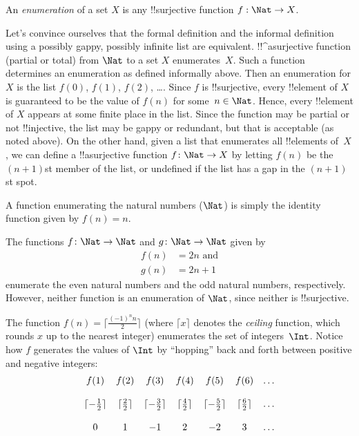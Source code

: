 \documentclass[../../include/open-logic-section]{subfiles}
\begin{document}
\begin{defn}
An \emph{enumeration} of a set $X$ is any !!{surjective} function $f: 
\Nat \rightarrow X$.
\end{defn}

\begin{explain}
Let's convince ourselves that the formal definition and the informal
definition using a possibly gappy, possibly infinite list are
equivalent. !!^a{surjective} function (partial or total) from $\Nat$ to
a set $X$ enumerates~$X$. Such a function determines an enumeration as
defined informally above. Then an enumeration for $X$ is the list
$f(0)$, $f(1)$, $f(2)$, \dots. Since $f$ is !!{surjective}, every
!!{element} of $X$ is guaranteed to be the value of $f(n)$ for some~$n
\in \Nat$.  Hence, every !!{element} of $X$ appears at some finite
place in the list. Since the function may be partial or not !!{injective},
the list may be gappy or redundant, but that is acceptable (as noted
above). On the other hand, given a list that enumerates all
!!{element}s of~$X$, we can define a !!a{surjective} function $f\colon
\Nat \to X$ by letting $f(n)$ be the $(n+1)$st member of the list, or
undefined if the list has a gap in the $(n+1)$st spot.
\end{explain}

\begin{ex}
A function enumerating the natural numbers ($\Nat$) is 
simply the identity function given by $f(n) = n$.
\end{ex}

\begin{ex}
The functions $f\colon \Nat \to \Nat$ and $g \colon \Nat \to \Nat$ given by
\begin{align}
f(n) & = 2n \text{ and}\\
g(n) & = 2n+1
\end{align}
enumerate the even natural numbers and the odd natural numbers, 
respectively. However, neither function is an enumeration of 
$\Nat$, since neither is !!{surjective}.
\end{ex}

\begin{ex}
The function $f(n) = \lceil \frac{(-1)^n n}{2}\rceil$ (where $\lceil x
\rceil$ denotes the \emph{ceiling} function, which rounds $x$ up to
the nearest integer) enumerates the set of integers~$\Int$. Notice
how $f$ generates the values of $\Int$ by ``hopping'' back and forth
between positive and negative integers: 
\[
\begin{array}{c c c c c c c}
f(1) & f(2) & f(3) & f(4) & f(5) & f(6) & \dots \\ \\
\lceil - \tfrac{1}{2}\rceil & \lceil \tfrac{2}{2} \rceil & \lceil - 
\tfrac{3}{2} \rceil & \lceil \tfrac{4}{2} \rceil  & \lceil -\tfrac{5}{2} 
\rceil & \lceil \tfrac{6}{2} \rceil & \dots \\ \\
0 & 1 & -1 & 2 & -2 & 3 & \dots
\end{array}
\]
\end{ex}
\end{document}
